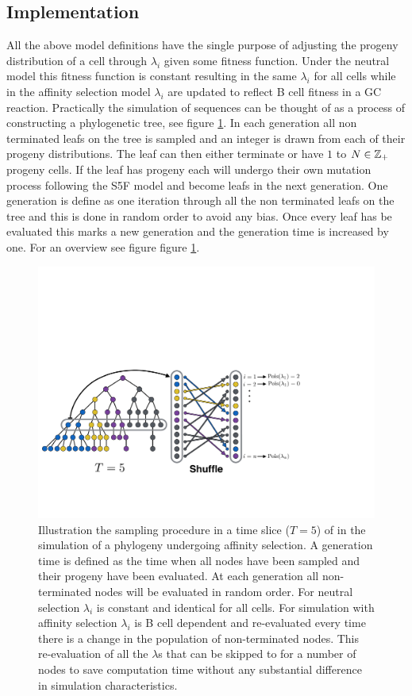 \subsection{Implementation} 
All the above model definitions have the single purpose of adjusting the progeny distribution of a cell through $\lambda_i$ given some fitness function.
Under the neutral model this fitness function is constant resulting in the same $\lambda_i$ for all cells while in the affinity selection model $\lambda_i$ are updated to reflect B cell fitness in a GC reaction.
Practically the simulation of sequences can be thought of as a process of constructing a phylogenetic tree, see figure \ref{fig:tree_iteration}.
In each generation all non terminated leafs on the tree is sampled and an integer is drawn from each of their progeny distributions.
The leaf can then either terminate or have $1$ to $N \in \mathbb{Z}_+$ progeny cells.
If the leaf has progeny each will undergo their own mutation process following the S5F model and become leafs in the next generation.
One generation is define as one iteration through all the non terminated leafs on the tree and this is done in random order to avoid any bias.
Once every leaf has be evaluated this marks a new generation and the generation time is increased by one.
For an overview see figure figure \ref{fig:tree_iteration}.

\begin{figure}
    \centering
    \includegraphics[width=1\textwidth]{figures/tree_iteration.pdf}
    \caption{
        \label{fig:tree_iteration}
        Illustration the sampling procedure in a time slice ($T=5$) of in the simulation of a phylogeny undergoing affinity selection.
        A generation time is defined as the time when all nodes have been sampled and their progeny have been evaluated.
        At each generation all non-terminated nodes will be evaluated in random order.
        For neutral selection $\lambda_i$ is constant and identical for all cells.
        For simulation with affinity selection $\lambda_i$ is B cell dependent and re-evaluated every time there is a change in the population of non-terminated nodes.
        This re-evaluation of all the $\lambda$s that can be skipped to for a number of nodes to save computation time without any substantial difference in simulation characteristics.
    }
\end{figure}


